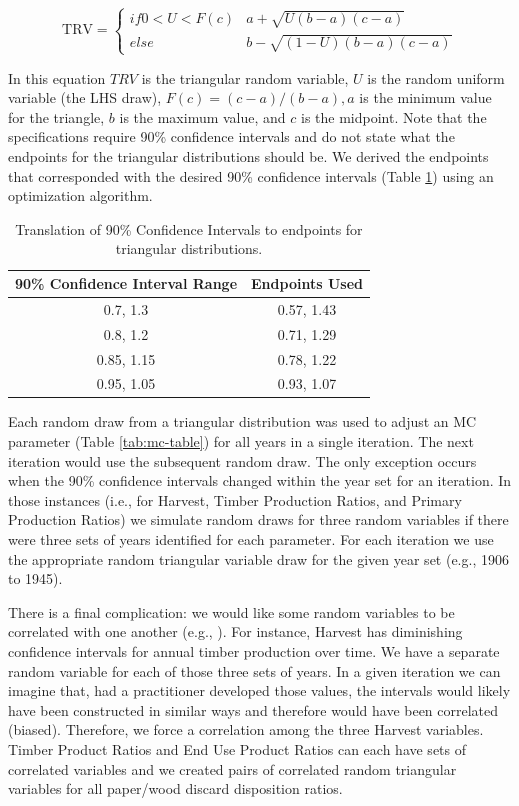 \documentclass[
  openany]{book}
\begin{document}
\[   \text{TRV} =
  \begin{cases}
    if 0 < U < F(c)       & a + \sqrt{U(b-a)(c-a)}\\
    else  & b - \sqrt{(1-U)(b-a)(c-a)}
  \end{cases} \]

In this equation \(TRV\) is the triangular random variable, \(U\) is the random uniform variable (the LHS draw), \(F(c)=(c-a)/(b-a), a\) is the minimum value for the triangle, \(b\) is the maximum value, and \(c\) is the midpoint. Note that the specifications require 90\% confidence intervals and do not state what the endpoints for the triangular distributions should be. We derived the endpoints that corresponded with the desired 90\% confidence intervals (Table \ref{tab:triang-tab}) using an optimization algorithm.

\begin{table}

\caption{\label{tab:triang-tab}Translation of 90\% Confidence Intervals to endpoints for triangular distributions.}
\centering
\begin{tabular}[t]{cc}
\toprule
90\% Confidence Interval Range & Endpoints Used\\
\midrule
0.7, 1.3 & 0.57, 1.43\\
0.8, 1.2 & 0.71, 1.29\\
0.85, 1.15 & 0.78, 1.22\\
0.95, 1.05 & 0.93, 1.07\\
\bottomrule
\end{tabular}
\end{table}

Each random draw from a triangular distribution was used to adjust an MC parameter (Table \ref{tab:mc-table}) for all years in a single iteration. The next iteration would use the subsequent random draw. The only exception occurs when the 90\% confidence intervals changed within the year set for an iteration. In those instances (i.e., for Harvest, Timber Production Ratios, and Primary Production Ratios) we simulate random draws for three random variables if there were three sets of years identified for each parameter. For each iteration we use the appropriate random triangular variable draw for the given year set (e.g., 1906 to 1945).

There is a final complication: we would like some random variables to be correlated with one another (e.g., \textcite{stockmann2012}). For instance, Harvest has diminishing confidence intervals for annual timber production over time. We have a separate random variable for each of those three sets of years. In a given iteration we can imagine that, had a practitioner developed those values, the intervals would likely have been constructed in similar ways and therefore would have been correlated (biased). Therefore, we force a correlation among the three Harvest variables. Timber Product Ratios and End Use Product Ratios can each have sets of correlated variables and we created pairs of correlated random triangular variables for all paper/wood discard disposition ratios.
\end{document}
